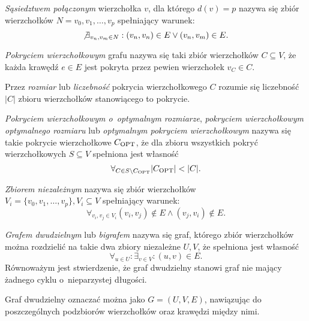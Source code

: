 \begin{definition}
  \emph{Sąsiedztwem połączonym} wierzchołka $v$, dla którego $d(v)=p$ nazywa się zbiór wierzchołków 
  $N={v_0, v_1, \ldots, v_p}$ spełniający warunek:\[
  \not \exists_{v_n, v_m \in N}:{(v_n,v_n) \in E \lor (v_n,v_m) \in E}.
  \]
\end{definition}

\begin{definition}
  \emph{Pokryciem wierzchołkowym} grafu nazywa się taki zbiór wierzchołków
  $C \subseteq V$, że każda krawędź $e \in E$ jest pokryta przez pewien wierzchołek $ v_C \in C$.
\end{definition}

\begin{definition}
  Przez \emph{rozmiar} lub \emph{liczebność} pokrycia wierzchołkowego $C$ rozumie się liczebność $|C|$ zbioru wierzchołków stanowiącego to pokrycie.
\end{definition}

\begin{definition}
  \emph{Pokryciem wierzchołkowym o~optymalnym rozmiarze}, \emph{pokryciem wierzchołkowym optymalnego rozmiaru} lub \emph{optymalnym pokryciem wierzchołkowym} 
  nazywa się takie pokrycie wierzchołkowe $C_{\textnormal{OPT}}$, że dla zbioru wszystkich pokryć wierzchołkowych $S \subseteq V$ spełniona jest własność \[\forall_{C \in S \setminus C_{\textnormal{OPT}}}{|C_{\textnormal{OPT}}| < |C|}.\]
\end{definition}

\begin{definition}
  \emph{Zbiorem niezależnym} nazywa się zbiór wierzchołków\\
  $V_i=\{v_0, v_1, \ldots, v_p \}, V_i \subseteq V$ spełniający warunek:
  \[\forall_{v_i, v_j \in V_i}{(v_i, v_j) \notin E \land (v_j, v_i) \notin E}.\]
\end{definition}

\begin{definition}
  \emph{Grafem dwudzielnym} lub \emph{bigrafem} nazywa się graf, którego zbiór wierzchołków można rozdzielić na takie dwa zbiory niezależne $U, V$, że spełniona jest własność \[\forall_{u \in U}: \exists_{v \in V}: (u,v) \in E.\]
  Równoważym jest stwierdzenie, że graf dwudzielny stanowi graf nie mający
  żadnego cyklu o~nieparzystej długości.

  Graf dwudzielny oznaczać można jako $G=(U,V,E)$, nawiązując do poszczególnych
  podzbiorów wierzchołków oraz krawędzi między nimi.
\end{definition}

